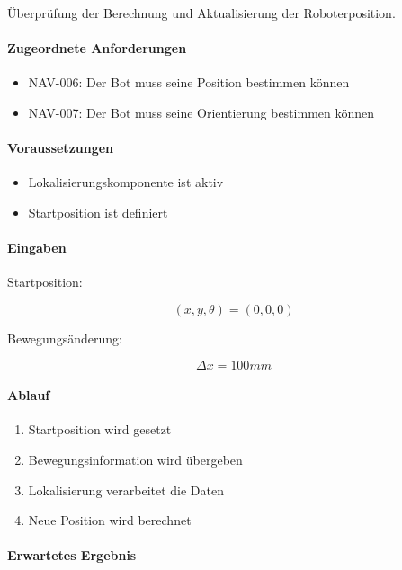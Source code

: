 Überprüfung der Berechnung und Aktualisierung der Roboterposition.

\paragraph{Zugeordnete Anforderungen}\label{zugeordnete-anforderungen-1}

\begin{itemize}
\tightlist
\item
  NAV-006: Der Bot muss seine Position bestimmen können
\item
  NAV-007: Der Bot muss seine Orientierung bestimmen können
\end{itemize}

\paragraph{Voraussetzungen}\label{voraussetzungen-1}

\begin{itemize}
\tightlist
\item
  Lokalisierungskomponente ist aktiv
\item
  Startposition ist definiert
\end{itemize}

\paragraph{Eingaben}\label{eingaben-1}

Startposition:

\[
(x,y,\theta)=(0,0,0)
\]

Bewegungsänderung:

\[
\Delta x=100mm
\]

\paragraph{Ablauf}\label{ablauf-1}

\begin{enumerate}
\def\labelenumi{\arabic{enumi}.}
\tightlist
\item
  Startposition wird gesetzt
\item
  Bewegungsinformation wird übergeben
\item
  Lokalisierung verarbeitet die Daten
\item
  Neue Position wird berechnet
\end{enumerate}

\paragraph{Erwartetes Ergebnis}\label{erwartetes-ergebnis-1}

